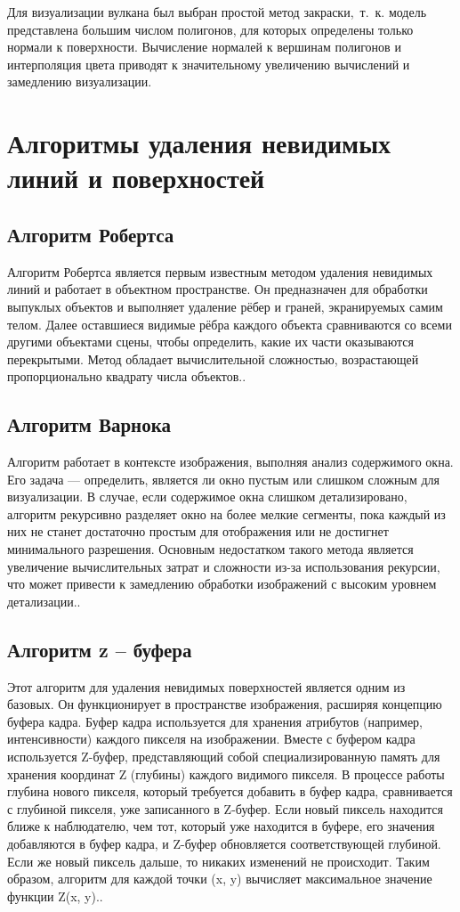 Для визуализации вулкана был выбран простой метод закраски,~т.~к. модель представлена большим числом полигонов, для которых определены только нормали к поверхности. Вычисление нормалей к вершинам полигонов и интерполяция цвета приводят к значительному увеличению вычислений и замедлению визуализации.
 
\section{Алгоритмы удаления невидимых линий и поверхностей}

\subsection{Алгоритм Робертса} 

Алгоритм Робертса является первым известным методом удаления невидимых линий и работает в объектном пространстве. Он предназначен для обработки выпуклых объектов и выполняет удаление рёбер и граней, экранируемых самим телом. Далее оставшиеся видимые рёбра каждого объекта сравниваются со всеми другими объектами сцены, чтобы определить, какие их части оказываются перекрытыми. Метод обладает вычислительной сложностью, возрастающей пропорционально квадрату числа объектов.\cite{lit2}.

\subsection{Алгоритм Варнока}
Алгоритм работает в контексте изображения, выполняя анализ содержимого окна. Его задача --- определить, является ли окно пустым или слишком сложным для визуализации. В случае, если содержимое окна слишком детализировано, алгоритм рекурсивно разделяет окно на более мелкие сегменты, пока каждый из них не станет достаточно простым для отображения или не достигнет минимального разрешения. Основным недостатком такого метода является увеличение вычислительных затрат и сложности из-за использования рекурсии, что может привести к замедлению обработки изображений с высоким уровнем детализации.\cite{lit2}.

\subsection{Алгоритм z – буфера}
Этот алгоритм для удаления невидимых поверхностей является одним из базовых. Он функционирует в пространстве изображения, расширяя концепцию буфера кадра. Буфер кадра используется для хранения атрибутов (например, интенсивности) каждого пикселя на изображении. Вместе с буфером кадра используется Z-буфер, представляющий собой специализированную память для хранения координат Z (глубины) каждого видимого пикселя. В процессе работы глубина нового пикселя, который требуется добавить в буфер кадра, сравнивается с глубиной пикселя, уже записанного в Z-буфер. Если новый пиксель находится ближе к наблюдателю, чем тот, который уже находится в буфере, его значения добавляются в буфер кадра, и Z-буфер обновляется соответствующей глубиной. Если же новый пиксель дальше, то никаких изменений не происходит. Таким образом, алгоритм для каждой точки (x, y) вычисляет максимальное значение функции Z(x, y).\cite{lit2}.


